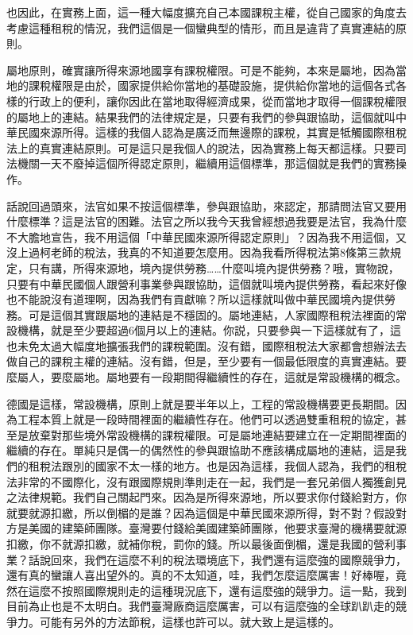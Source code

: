 \documentclass[oneside,sub3section]{ctexbook}
\begin{document}
也因此，在實務上面，這一種大幅度擴充自己本國課稅主權，從自己國家的角度去考慮這種租稅的情況，我們這個是一個蠻典型的情形，而且是違背了真實連結的原則。

屬地原則，確實讓所得來源地國享有課稅權限。可是不能夠，本來是屬地，因為當地的課稅權限是由於，國家提供給你當地的基礎設施，提供給你當地的這個各式各樣的行政上的便利，讓你因此在當地取得經濟成果，從而當地才取得一個課稅權限的屬地上的連結。結果我們的法律規定是，只要有我們的參與跟協助，這個就叫中華民國來源所得。這樣的我個人認為是廣泛而無邊際的課稅，其實是牴觸國際租稅法上的真實連結原則。可是這只是我個人的說法，因為實務上每天都這樣。只要司法機關一天不廢掉這個所得認定原則，繼續用這個標準，那這個就是我們的實務操作。

話說回過頭來，法官如果不按這個標準，參與跟協助，來認定，那請問法官又要用什麼標準？這是法官的困難。法官之所以我今天我曾經想過我要是法官，我為什麼不大膽地宣告，我不用這個「中華民國來源所得認定原則」？因為我不用這個，又沒上過柯老師的稅法，我真的不知道要怎麼用。因為我看所得稅法第8條第三款規定，只有講，所得來源地，境內提供勞務\ldots\ldots 什麼叫境內提供勞務？哦，實物說，只要有中華民國個人跟營利事業參與跟協助，這個就叫境內提供勞務，看起來好像也不能說沒有道理啊，因為我們有貢獻嘛？所以這樣就叫做中華民國境內提供勞務。可是這個其實跟屬地的連結是不穩固的。屬地連結，人家國際租稅法裡面的常設機構，就是至少要超過6個月以上的連結。你説，只要參與一下這樣就有了，這也未免太過大幅度地擴張我們的課稅範圍。沒有錯，國際租稅法大家都會想辦法去做自己的課稅主權的連結。沒有錯，但是，至少要有一個最低限度的真實連結。要麼屬人，要麼屬地。屬地要有一段期間得繼續性的存在，這就是常設機構的概念。

德國是這樣，常設機構，原則上就是要半年以上，工程的常設機構要更長期間。因為工程本質上就是一段時間裡面的繼續性存在。他們可以透過雙重租稅的協定，甚至是放棄對那些境外常設機構的課稅權限。可是屬地連結要建立在一定期間裡面的繼續的存在。單純只是偶一的偶然性的參與跟協助不應該構成屬地的連結，這是我們的租稅法跟別的國家不太一樣的地方。也是因為這樣，我個人認為，我們的租稅法非常的不國際化，沒有跟國際規則準則走在一起，我們是一套兄弟個人獨獲創見之法律規範。我們自己關起門來。因為是所得來源地，所以要求你付錢給對方，你就要就源扣繳，所以倒楣的是誰？因為這個是中華民國來源所得，對不對？假設對方是美國的建築師團隊。臺灣要付錢給美國建築師團隊，他要求臺灣的機構要就源扣繳，你不就源扣繳，就補你稅，罰你的錢。所以最後面倒楣，還是我國的營利事業？話說回來，我們在這麼不利的稅法環境底下，我們還有這麼強的國際競爭力，還有真的蠻讓人喜出望外的。真的不太知道，哇，我們怎麼這麼厲害！好棒喔，竟然在這麼不按照國際規則走的這種現況底下，還有這麼強的競爭力。這一點，我到目前為止也是不太明白。我們臺灣廠商這麼厲害，可以有這麼強的全球趴趴走的競爭力。可能有另外的方法節稅，這樣也許可以。就大致上是這樣的。
\end{document}
